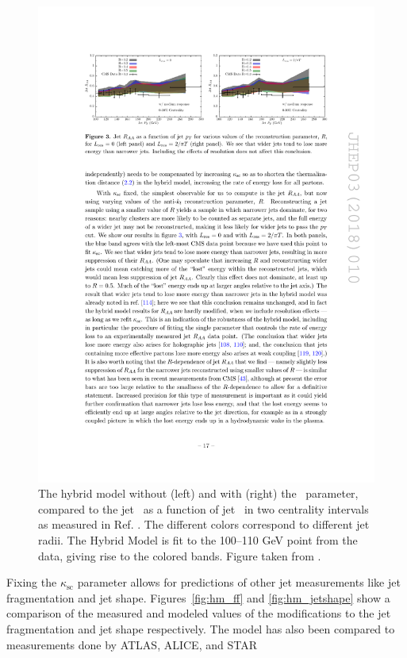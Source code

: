 \begin{figure}[htbp]
\begin{center}
\includegraphics[width=1\textwidth]{figures/jetMeasurements/HM_raa}
\caption{The hybrid model without (left) and with (right) the \Lres\ parameter, compared to the jet \RAA\ as a function of jet \pt\ in two centrality intervals as measured in Ref. \cite{Khachatryan:2016jfl}. The different colors correspond to different jet radii. The Hybrid Model is fit to the 100--110 GeV point from the data, giving rise to the colored bands. Figure taken from \cite{Hulcher:2017cpt}. }
\label{fig:hm_fitting}
\end{center}
\end{figure}

Fixing the $\kappa_\mathrm{sc}$ parameter allows for predictions of other jet measurements like jet fragmentation and jet shape. Figures~\ref{fig:hm_ff} and \ref{fig:hm_jetshape} show a comparison of the measured and modeled values of the modifications to the jet fragmentation and jet shape respectively.  The model has also been compared to measurements done by ATLAS, ALICE, and STAR \cite{2013220, Abelev:2013kqa, RUSNAK:2014xfa} \cite{}


